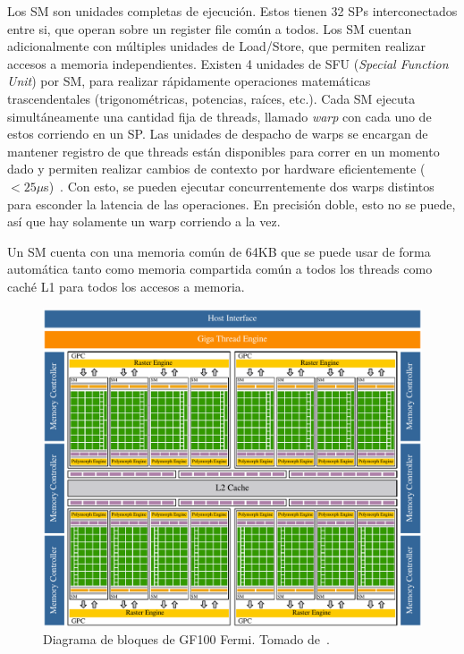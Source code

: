 Los SM son unidades completas de ejecuci\'on. Estos tienen 32 SPs interconectados entre si, que operan sobre
un register file com\'un a todos. Los SM cuentan adicionalmente con m\'ultiples unidades de Load/Store,
que permiten realizar accesos a memoria independientes. Existen 4 unidades de SFU (\textit{Special Function
Unit}) por SM, para realizar r\'apidamente operaciones matem\'aticas trascendentales (trigonom\'etricas, potencias,
ra\'ices, etc.). Cada SM ejecuta simult\'aneamente una cantidad fija de threads, llamado \textit{warp}
con cada uno de estos corriendo en un SP. Las unidades de despacho de warps se encargan de mantener registro de que
threads est\'an disponibles para correr en un momento dado y permiten realizar cambios de contexto por hardware
eficientemente ($<25 \mu$s)~\cite{PattersonFermi}. Con esto, se pueden ejecutar
concurrentemente dos warps distintos para esconder la latencia de las operaciones. En precisi\'on doble,
esto no se puede, as\'i que hay solamente un warp corriendo a la vez.

Un SM cuenta con una memoria com\'un de 64KB que se puede usar de forma autom\'atica tanto como memoria
compartida com\'un a todos los threads como cach\'e L1 para todos los accesos a memoria.

\begin{figure}[htbp]
    \centering
    \includegraphics[width=\plotwidthsmaller]{images/fermi-gpu-block.pdf}
    \caption{Diagrama de bloques de GF100 Fermi. Tomado de~\cite{NvidiaFermi}.}
    \label{fermi_gpu_block}
\end{figure}


